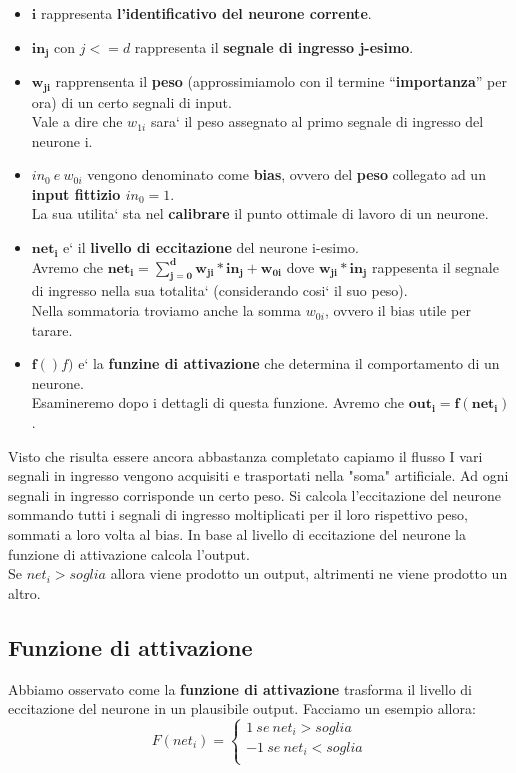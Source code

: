 \begin{itemize}
    \item \( \mathbf{i}\) rappresenta \textbf{l'identificativo del neurone corrente}.
    \item \( \mathbf{in_j} \) con  \(j<=d\) rappresenta il 
%    
    \textbf{segnale di ingresso j-esimo}.
    \item \( \mathbf{w_{ji}} \) rapprensenta il \textbf{peso} 
%
    (approssimiamolo con il termine ``\textbf{importanza}'' per ora) di un 
%
    certo segnali di input.
\\
    Vale a dire che \(w_{1i}\) sara` il peso assegnato al primo segnale di
%   
    ingresso del neurone i. 
    \item \( in_0 \ e\  w_{0i} \) vengono denominato come \textbf{bias}, ovvero 
%
    del \textbf{peso} collegato ad un \textbf{input fittizio \(in_0=1\)}.
\\  
    La sua utilita` sta nel \textbf{calibrare} il punto ottimale di lavoro di un 
%
    neurone.
    \item \( \mathbf{net_i} \) e` il \textbf{livello di eccitazione} del neurone 
%
    i-esimo.
\\
    Avremo che \( \mathbf{net_i = \sum_{j=0}^{d}{w_{ji} * in_j + w_{0i}} } \) dove 
%
    \( \mathbf{w_{ji} * in_j} \) rappesenta il segnale di ingresso nella sua 
%
    totalita` (considerando cosi` il suo peso).
\\ 
    Nella sommatoria troviamo anche la somma \( w_{0i} \), ovvero il bias utile 
%
    per tarare.
    \item \( \mathbf{f()} f) \) e` la \textbf{funzine di attivazione} che determina il 
%
    comportamento di un neurone. 
\\ 
    Esamineremo dopo i dettagli di questa funzione.
%
    Avremo che \( \mathbf{out_i = f(net_i)} \).
\end{itemize}
Visto che risulta essere ancora abbastanza completato capiamo il flusso 
{
    I vari segnali in ingresso vengono acquisiti e trasportati nella "soma" 
    artificiale.
}
{
    Ad ogni segnali in ingresso corrisponde un certo peso.
}
{
    Si calcola l'eccitazione del neurone sommando tutti i segnali di ingresso 
%
    moltiplicati per il loro rispettivo peso, sommati a loro volta al bias.
}
{
    In base al livello di eccitazione del neurone la funzione di attivazione 
% 
    calcola l'output.
\\
    Se \(net_i > soglia\) allora viene prodotto un output, altrimenti ne viene 
%
    prodotto un altro.
}
\subsection{Funzione di attivazione}
Abbiamo osservato come la \textbf{funzione di attivazione} trasforma il livello di 
eccitazione del neurone in un plausibile output.
Facciamo un esempio allora:
\[F(net_i)=\begin{cases}
    1 \ se\ net_i>soglia \\
    -1 \ se\ net_i<soglia \\
\end{cases}\] 

 